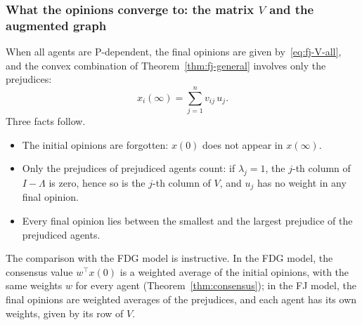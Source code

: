 \subsubsection{What the opinions converge to: the matrix \texorpdfstring{$V$}{V} and the augmented graph}
\label{subsubsec:fj-final}

When all agents are P-dependent, the final opinions are given
by~\eqref{eq:fj-V-all}, and the convex combination of Theorem~\ref{thm:fj-general}
involves only the prejudices:
\[
  x_i(\infty) = \sum_{j=1}^{n} v_{ij}\, u_j .
\]
Three facts follow.
\begin{itemize}
  \item The initial opinions are forgotten: $x(0)$ does not appear in $x(\infty)$.
  \item Only the prejudices of prejudiced agents count: if $\lambda_j = 1$, the $j$-th
        column of $I - \Lambda$ is zero, hence so is the $j$-th column of $V$, and
        $u_j$ has no weight in any final opinion.
  \item Every final opinion lies between the smallest and the largest prejudice of the
        prejudiced agents.
\end{itemize}
The comparison with the FDG model is instructive. In the FDG model, the consensus value
$w^\top x(0)$ is a weighted average of the initial opinions, with the same weights $w$
for every agent (Theorem~\ref{thm:consensus}); in the FJ model, the final opinions are weighted
averages of the prejudices, and each agent has its own weights, given by its row of
$V$.

